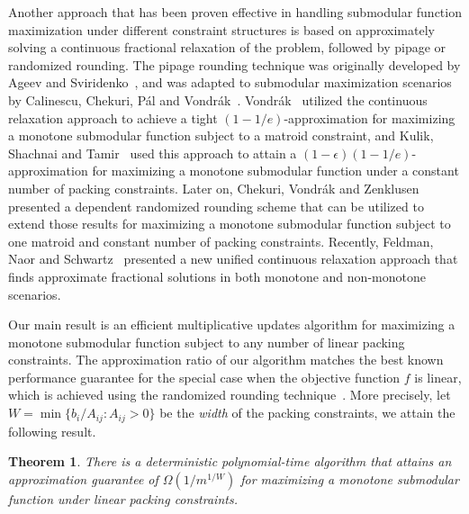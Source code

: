 \documentclass[11pt]{article}
\theoremstyle{plain}
\newtheorem{theorem}{Theorem}[section]
\theoremstyle{definition}
\begin{document}
Another approach that has been proven effective in handling
submodular function maximization under different constraint
structures is based on approximately solving a continuous
fractional relaxation of the problem, followed by pipage or
randomized rounding. The pipage rounding technique was originally
developed by Ageev and Sviridenko~\cite{AgeevS04}, and was adapted
to submodular maximization scenarios by Calinescu, Chekuri,
P{\'a}l and Vondr{\'a}k~\cite{CalinescuCPV07}.
Vondr{\'a}k~\cite{Vondrak08} utilized the continuous relaxation
approach to achieve a tight $(1 - 1/e)$-approximation for
maximizing a monotone submodular function subject to a matroid
constraint, and Kulik, Shachnai and Tamir~\cite{KulikST09} used
this approach to attain a $(1 - \epsilon)(1 - 1/e)$-approximation
for maximizing a monotone submodular function under a constant
number of packing constraints. Later on, Chekuri, Vondr{\'a}k and
Zenklusen~\cite{ChekuriVZ10} presented a dependent randomized
rounding scheme that can be utilized to extend those results for
maximizing a monotone submodular function subject to one matroid
and constant number of packing constraints. Recently, Feldman,
Naor and Schwartz~\cite{FeldmanNS11a} presented a new unified
continuous relaxation approach that finds approximate fractional
solutions in both monotone and non-monotone scenarios.

\medskip {}
Our main result is an efficient multiplicative updates algorithm
for maximizing a monotone submodular function subject to any
number of linear packing constraints. The approximation ratio of
our algorithm matches the best known performance guarantee for the
special case when the objective function $f$ is linear, which is
achieved using the randomized rounding
technique~\cite{RaghavanT87,Raghavan88,Srinivasan99}. More
precisely, let $W = \min\{b_i / A_{ij} : A_{ij} > 0\}$ be the
\emph{width} of the packing constraints, we attain the following
result.

\begin{theorem} \label{th:MainResult1}
There is a deterministic polynomial-time algorithm that attains an
approximation guarantee of $\Omega(1 / m^{1/W})$ for maximizing a
monotone submodular function under linear packing constraints.
\end{theorem}
\end{document}
